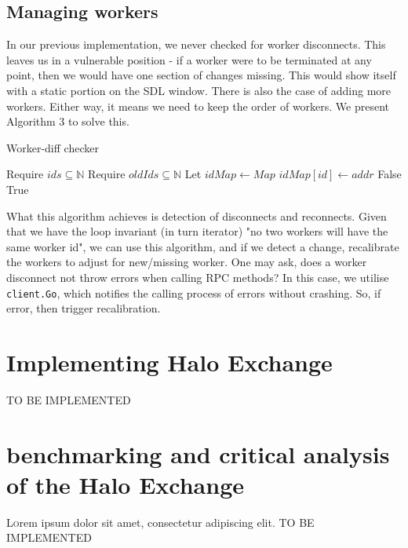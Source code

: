 \documentclass[twoside,twocolumn]{article}
\begin{document}
\subsection{Managing workers}
In our previous implementation, we never checked for worker disconnects. This leaves us in a vulnerable
position - if a worker were to be terminated at any point, then we would have one section of changes missing.
This would show itself with a static portion on the SDL window. There is also the case of adding more workers. Either
way, it means we need to keep the order of workers. We present Algorithm 3 to solve this.
\begin{algorithm}
  \caption{Worker-diff checker}
  \begin{algorithmic}
    \State Require $ids \subseteq \mathbb{N}$
    \State Require $oldIds \subseteq \mathbb{N}$ 
    \State Let $idMap \gets Map$
      \State $idMap[id] \gets addr$
    \EndFor
      \State \Return False
      \EndIf
    \EndFor
    \State \Return True
  \end{algorithmic}
\end{algorithm}


What this algorithm achieves is detection of disconnects and reconnects.
Given that we have the loop invariant (in turn iterator) "no two workers will have the same worker id",
we can use this algorithm, and if we detect a change, recalibrate the workers to adjust for new/missing worker. 
One may ask, does a worker disconnect not throw errors when calling RPC methods? In this case, we utilise \texttt{client.Go},
which notifies the calling process of errors without crashing. So, if error, then trigger recalibration.

\section{Implementing Halo Exchange}

TO BE IMPLEMENTED

\section{benchmarking and critical analysis of the Halo Exchange}

\lettrine[nindent=0em,lines=3]{L} orem ipsum dolor sit amet, consectetur adipiscing elit.
TO BE IMPLEMENTED
\end{document}
